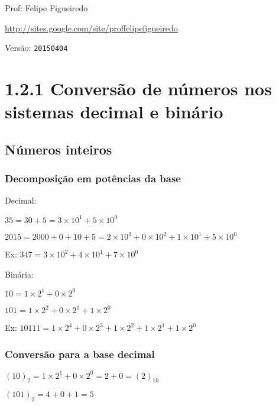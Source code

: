 \documentclass[a4paper]{article}
\begin{document}
\parbox[c]{.825\textwidth}{\raggedright%
{Prof: Felipe Figueiredo\par}
{\url{http://sites.google.com/site/proffelipefigueiredo}\par}
}

Versão: \verb|20150404|




\section*{1.2.1 Conversão de números nos sistemas decimal e binário}

\subsection*{Números inteiros}
\subsubsection*{Decomposição em potências da base}
 
Decimal:

$35 = 30+5 = 3\times 10^1 + 5\times 10^0$

$2015 = 2000 + 0+ 10 + 5 = 2\times 10^3+0\times 10^2+1\times 10^1+5\times 10^0$

Ex: $347 = 3\times 10^2 + 4\times 10^1+7\times 10^0$

Binária:

$10 = 1\times 2^1+0\times 2^0$

$101=1\times 2^2+0\times 2^1+1\times 2^0$

Ex: $10111 = 1\times 2^4  + 0\times 2^3 + 1\times 2^2 + 1\times 2^1 + 1\times 2^0$

\subsubsection*{Conversão para a base decimal}

$(10)_2 = 1\times 2^1+0\times 2^0 = 2+0 = (2)_{10}$

$(101)_2 = 4+0+1 = 5$
\end{document}
